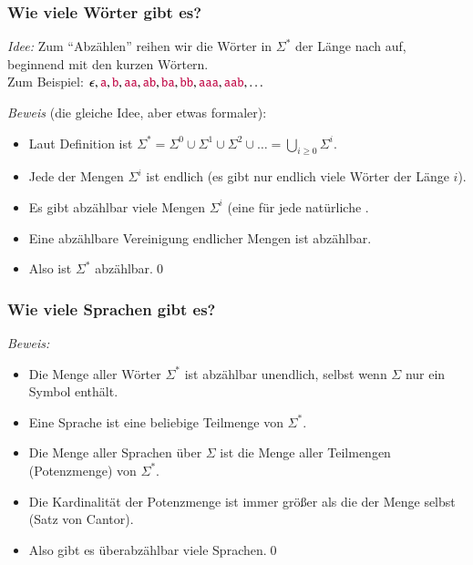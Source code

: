 \documentclass[onlymath]{beamer}
\begin{document}
\begin{frame}\frametitle{Wie viele Wörter gibt es?}

\pause

\pause

\emph{Idee:} Zum "`Abzählen"' reihen wir die Wörter in $\Sigma^*$ der Länge nach auf, beginnend mit den kurzen Wörtern.\\
Zum Beispiel: $\epsilon, \mathtt{\textcolor{purple}{a}}, \mathtt{\textcolor{purple}{b}}, \mathtt{\textcolor{purple}{aa}}, \mathtt{\textcolor{purple}{ab}}, \mathtt{\textcolor{purple}{ba}}, \mathtt{\textcolor{purple}{bb}}, \mathtt{\textcolor{purple}{aaa}}, \mathtt{\textcolor{purple}{aab}},\ldots$
\smallskip
\pause

\emph{Beweis} (die gleiche Idee, aber etwas formaler):\\
\begin{itemize}
\item Laut Definition ist $\Sigma^* = \Sigma^0 \cup \Sigma^1 \cup \Sigma^2 \cup \ldots = \bigcup_{i\geq 0} \Sigma^i$.\\
\item Jede der Mengen $\Sigma^i$ ist endlich (es gibt nur endlich viele Wörter der Länge $i$).\\
\item Es gibt abzählbar viele Mengen $\Sigma^i$ (eine für jede natürliche .\\
\item Eine abzählbare Vereinigung endlicher Mengen ist abzählbar.\\
\item Also ist $\Sigma^*$ abzählbar.\qed
\end{itemize}


\end{frame}

\begin{frame}\frametitle{Wie viele Sprachen gibt es?}

\pause

\pause

\emph{Beweis:}
\begin{itemize}
\item Die Menge aller Wörter \alert{$\Sigma^*$ ist abzählbar unendlich}, selbst wenn $\Sigma$ nur ein Symbol enthält.
\item Eine Sprache ist eine beliebige Teilmenge von $\Sigma^*$.
\item Die Menge aller Sprachen über $\Sigma$ ist die Menge aller Teilmengen (\alert{Potenzmenge}) von $\Sigma^*$.
\item Die Kardinalität der Potenzmenge ist immer größer als die der Menge selbst (\alert{Satz von Cantor}).
\item Also gibt es überabzählbar viele Sprachen.\qed
\end{itemize}

\end{frame}
\end{document}

